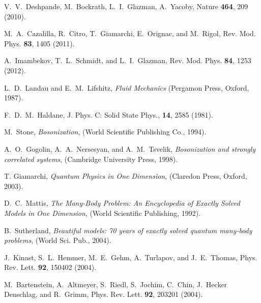 \begin{thebibliography}{99}

V.~V.~Deshpande, M.~Bockrath, L.~I.~Glazman, A.~Yacoby, Nature \textbf{464}, 209 (2010). 

M.~A.~Cazalilla, R.~Citro, T.~Giamarchi, E.~Orignac, and M.~Rigol, 
Rev. Mod. Phys. \textbf{83}, 1405 (2011).

A.~Imambekov, T.~L.~Schmidt, and L.~I.~Glazman,
Rev. Mod. Phys. \textbf{84}, 1253 (2012).

L.~D.~Landau and E.~M.~Lifshitz, \textit{Fluid Mechanics} (Pergamon Press, Oxford, 1987).

F.~D.~M.~Haldane, J. Phys. C: Solid State Phys., \textbf{14}, 2585 (1981).

M.~Stone, \textit{Bosonization}, (World Scientific Publishing Co., 1994).

A.~O.~Gogolin, A.~A.~Nersesyan, and A.~M.~Tsvelik, \textit{Bosonization and strongly correlated
systems}, (Cambridge University Press, 1998).

T. Giamarchi, \textit{Quantum Physics in One Dimension}, (Claredon Press, Oxford, 2003).

D.~C.~Mattis, \textit{The Many-Body Problem: An Encyclopedia of Exactly Solved Models in One Dimension}, (World Scientific Publishing, 1992).

B.~Sutherland, \textit{Beautiful models: 70 years of exactly solved quantum many-body problems}, (World Sci. Pub., 2004).

J.~Kinast, S.~L.~Hemmer, M.~E.~Gehm, A.~Turlapov, and J.~E.~Thomas, 
Phys. Rev. Lett. \textbf{92}, 150402 (2004).

M.~Bartenstein, A.~Altmeyer, S.~Riedl, S.~Jochim, C.~Chin, J.~Hecker Denschlag, and R.~Grimm, 
Phys. Rev. Lett. \textbf{92}, 203201 (2004).


\end{thebibliography}
